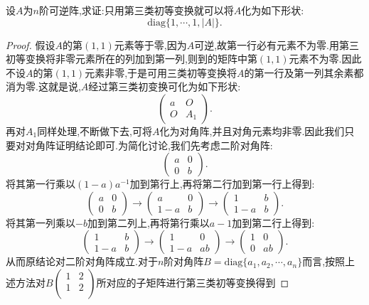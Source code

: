 \documentclass[../../main.tex]{subfiles}%
\begin{document}
\begin{example}\label{可逆阵都能只用第三类初等变换化为对角阵}
设\(A\)为\(n\)阶可逆阵,求证:只用第三类初等变换就可以将\(A\)化为如下形状:
\[
\mathrm{diag}\{1,\cdots,1,|A|\}.
\]
\end{example}
\begin{proof}

假设\(A\)的第\((1,1)\)元素等于零,因为\(A\)可逆,故第一行必有元素不为零.用第三初等变换将非零元素所在的列加到第一列,则到的矩阵中第\((1,1)\)元素不为零.因此不设\(A\)的第\((1,1)\)元素非零,于是可用三类初等变换将\(A\)的第一行及第一列其余素都消为零.这就是说,\(A\)经过第三类初变换可化为如下形状:
\[
\begin{pmatrix}
a & O \\
O & A_1
\end{pmatrix}.
\]
再对\(A_1\)同样处理,不断做下去,可将\(A\)化为对角阵,并且对角元素均非零.因此我们只要对对角阵证明结论即可.为简化讨论,我们先考虑二阶对角阵:
\[
\begin{pmatrix}
a & 0 \\
0 & b
\end{pmatrix}.
\]
将其第一行乘以\((1 - a)a^{-1}\)加到第行上,再将第二行加到第一行上得到:
\[
\begin{pmatrix}
a & 0 \\
0 & b
\end{pmatrix} \to
\begin{pmatrix}
a & 0 \\
1 - a & b
\end{pmatrix} \to
\begin{pmatrix}
1 & b \\
1 - a & b
\end{pmatrix}.
\]
将其第一列乘以\(-b\)加到第二列上,再将第行乘以\(a - 1\)加到第二行上得到:
\[
\begin{pmatrix}
1 & b \\
1 - a & b
\end{pmatrix} \to
\begin{pmatrix}
1 & 0 \\
1 - a & ab
\end{pmatrix} \to
\begin{pmatrix}
1 & 0 \\
0 & ab
\end{pmatrix}.
\]
从而原结论对二阶对角阵成立.对于$n$阶对角阵$B=\mathrm{diag}\{a_1,a_2,\cdots,a_n\}$而言,按照上述方法对$B\left( \begin{matrix}
1&		2\\
1&		2\\
\end{matrix} \right) $所对应的子矩阵进行第三类初等变换得到

\end{proof}
\end{document}
